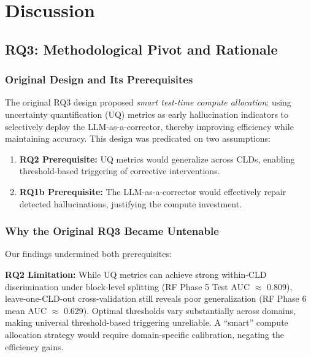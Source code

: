 \section{Discussion}
\label{sec:discussion}

\subsection{RQ3: Methodological Pivot and Rationale}
\label{sec:rq3_pivot}

\subsubsection{Original Design and Its Prerequisites}

The original RQ3 design proposed \textit{smart test-time compute allocation}: using uncertainty quantification (UQ) metrics as early hallucination indicators to selectively deploy the LLM-as-a-corrector, thereby improving efficiency while maintaining accuracy. This design was predicated on two assumptions:

\begin{enumerate}[noitemsep]
    \item \textbf{RQ2 Prerequisite:} UQ metrics would generalize across CLDs, enabling threshold-based triggering of corrective interventions.
    \item \textbf{RQ1b Prerequisite:} The LLM-as-a-corrector would effectively repair detected hallucinations, justifying the compute investment.
\end{enumerate}

\subsubsection{Why the Original RQ3 Became Untenable}

Our findings undermined both prerequisites:

\textbf{RQ2 Limitation:} While UQ metrics can achieve strong within-CLD discrimination under block-level splitting (RF Phase 5 Test AUC $\approx$ 0.809), leave-one-CLD-out cross-validation still reveals poor generalization (RF Phase 6 mean AUC $\approx$ 0.629). Optimal thresholds vary substantially across domains, making universal threshold-based triggering unreliable. A ``smart'' compute allocation strategy would require domain-specific calibration, negating the efficiency gains.

